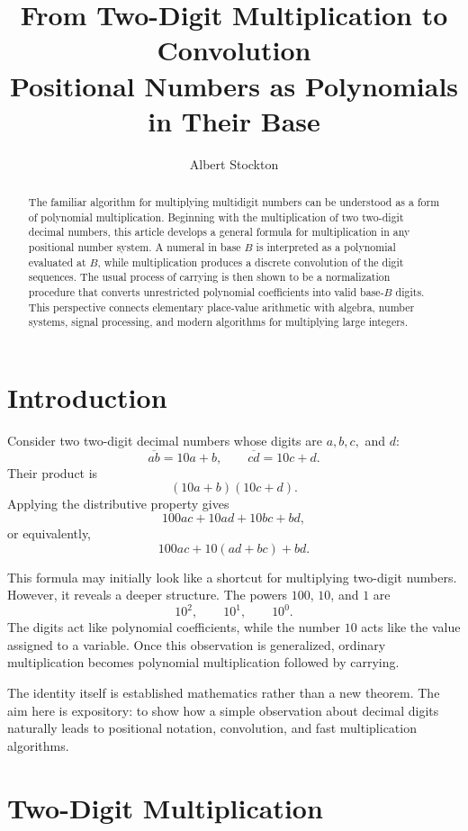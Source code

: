 \documentclass[11pt]{article}
\title{From Two-Digit Multiplication to Convolution\\
\large Positional Numbers as Polynomials in Their Base}
\author{Albert Stockton}
\date{}
\begin{document}
\maketitle

\begin{abstract}
The familiar algorithm for multiplying multidigit numbers can be understood as a form of polynomial multiplication. Beginning with the multiplication of two two-digit decimal numbers, this article develops a general formula for multiplication in any positional number system. A numeral in base $B$ is interpreted as a polynomial evaluated at $B$, while multiplication produces a discrete convolution of the digit sequences. The usual process of carrying is then shown to be a normalization procedure that converts unrestricted polynomial coefficients into valid base-$B$ digits. This perspective connects elementary place-value arithmetic with algebra, number systems, signal processing, and modern algorithms for multiplying large integers.
\end{abstract}

\section{Introduction}

Consider two two-digit decimal numbers whose digits are $a,b,c,$ and $d$:
\[
\overline{ab}=10a+b,
\qquad
\overline{cd}=10c+d.
\]
Their product is
\[
(10a+b)(10c+d).
\]
Applying the distributive property gives
\[
100ac+10ad+10bc+bd,
\]
or equivalently,
\[
\boxed{100ac+10(ad+bc)+bd}.
\]

This formula may initially look like a shortcut for multiplying two-digit numbers. However, it reveals a deeper structure. The powers $100$, $10$, and $1$ are
\[
10^2,\qquad 10^1,\qquad 10^0.
\]
The digits act like polynomial coefficients, while the number $10$ acts like the value assigned to a variable. Once this observation is generalized, ordinary multiplication becomes polynomial multiplication followed by carrying.

The identity itself is established mathematics rather than a new theorem. The aim here is expository: to show how a simple observation about decimal digits naturally leads to positional notation, convolution, and fast multiplication algorithms.

\section{Two-Digit Multiplication}
\end{document}
